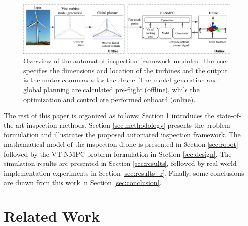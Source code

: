 \begin{figure}
    \centering
    \includegraphics[width=1\textwidth]{Phd_thesis/figures/abstract_vtmpc_1.pdf}
    \caption{Overview of the automated inspection framework modules. The user specifies the dimensions and location of the turbines and the output is the motor commands for the drone. The model generation and global planning are calculated pre-flight (offline), while the optimization and control are performed onboard (online).} 
    \label{fig:abstract}
\end{figure}


The rest of this paper is organized as follows: Section \ref{sec:RelatedWork} introduces the state-of-the-art inspection methods. Section \ref{sec:methodology} presents the problem formulation and illustrates the proposed automated inspection framework. The mathematical model of the inspection drone is presented in Section \ref{sec:robot} followed by the \ac{VT-NMPC} problem formulation in Section \ref{sec:design}. The simulation results are presented in Section \ref{sec:results}, followed by real-world implementation experiments in Section \ref{sec:results_r}. Finally, some conclusions are drawn from this work in Section \ref{sec:conclusion}.


\section{Related Work}
\label{sec:RelatedWork}



